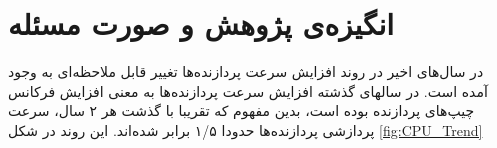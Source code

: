 
\section{انگیزه‌ی پژوهش و صورت  مسئله}
در سال‌های اخیر در روند افزایش سرعت پردازنده‌ها تغییر قابل ملاحظه‌ای به وجود آمده است. در سالهای گذشته افزایش سرعت پردازنده‌ها به معنی افزایش فرکانس چیپ‌های پردازنده بوده است، بدین مفهوم که تقریبا با گذشت هر ۲ سال،‌ سرعت پردازشی پردازنده‌ها حدودا ۱/۵ برابر شده‌اند. این روند در شکل 
\ref{fig:CPU_Trend}
